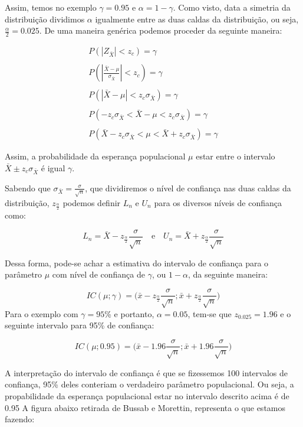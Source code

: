 \documentclass[
  letterpaper,
  DIV=11,
  numbers=noendperiod]{scrartcl}
\begin{document}
Assim, temos no exemplo \(\gamma=0.95\) e \(\alpha=1-\gamma\). Como
visto, data a simetria da distribuição dividimos \(\alpha\) igualmente
entre as duas caldas da distribuição, ou seja,
\(\frac{\alpha}{2}=0.025\). De uma maneira genérica podemos proceder da
seguinte maneira:

\[\begin{array}{clc}
P(|Z_{\bar{X}}|<z_c)=\gamma
\\
\\
P(|\frac{\bar{X}-\mu}{\sigma_{\bar{X}}}|<z_c)=\gamma
\\
\\
P(|\bar{X}-\mu|<z_c\sigma_{\bar{X}})=\gamma
\\
\\
P(-z_c\sigma_{\bar{X}}<\bar{X}-\mu<z_c\sigma_{\bar{X}})=\gamma
\\
\\
P(\bar{X}-z_c\sigma_{\bar{X}} <\mu< \bar{X}+ z_c\sigma_{\bar{X}})=\gamma
\end{array}\]

Assim, a probabilidade da esperança populacional \(\mu\) estar entre o
intervalo \(\bar{X} \pm z_c\sigma_{\bar{X}}\) é igual \(\gamma\).

Sabendo que \(\sigma_{\bar{X}}=\frac{\sigma}{\sqrt{n}}\), que
dividiremos o nível de confiança nas duas caldas da distribuição,
\(z_{\frac{\alpha}{2}}\) podemos definir \(L_n\) e \(U_n\) para os
diversos níveis de confiança como:

\[L_n=\bar{X}-z_{\frac{\alpha}{2}}\frac{\sigma}{\sqrt{n}} \quad \text{e} \quad U_n=\bar{X}+z_{\frac{\alpha}{2}}\frac{\sigma}{\sqrt{n}}\]

Dessa forma, pode-se achar a estimativa do intervalo de confiança para o
parâmetro \(\mu\) com nível de confiança de \(\gamma\), ou \(1-\alpha\),
da seguinte maneira:

\[IC(\mu;\gamma)=\bigg( \bar{x}-z_{\frac{\alpha}{2}}\frac{\sigma}{\sqrt{n}};\bar{x}+z_{\frac{\alpha}{2}}\frac{\sigma}{\sqrt{n}}\bigg)\]
Para o exemplo com \(\gamma=95\)\% e portanto, \(\alpha=0.05\), tem-se
que \(z_{0.025}=1.96\) e o seguinte intervalo para 95\% de confiança:

\[IC(\mu;0.95)=\bigg( \bar{x}-1.96\frac{\sigma}{\sqrt{n}};\bar{x}+1.96\frac{\sigma}{\sqrt{n}}\bigg)\]

A interpretação do intervalo de confiança é que se fizessemos 100
intervalos de confiança, 95\% deles conteriam o verdadeiro parâmetro
populacional. Ou seja, a propabilidade da esperança populacional estar
no intervalo descrito acima é de 0.95 A figura abaixo retirada de Bussab
e Morettin, representa o que estamos fazendo:
\end{document}
